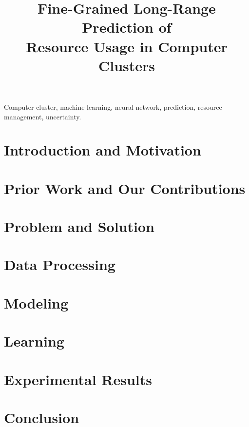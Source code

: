 \documentclass[journal]{IEEEtran}
\title{
  Fine-Grained Long-Range Prediction of\\
  Resource Usage in Computer Clusters
}
\author{}
\begin{document}
  \maketitle

  \begin{abstract}
    
  \end{abstract}

  \begin{IEEEkeywords}
    Computer cluster,
    machine learning,
    neural network,
    prediction,
    resource management,
    uncertainty.
  \end{IEEEkeywords}


  \section{Introduction and Motivation} 
  

  
  
  \section{Prior Work and Our Contributions} 
  

  \section{Problem and Solution} 
  

  \section{Data Processing} 
  

  \section{Modeling} 
  

  \section{Learning} 
  

  \section{Experimental Results} 
  

  \section{Conclusion} 
  
  

  \begingroup
    \linespread{0.95}
    
    
  \endgroup
\end{document}
